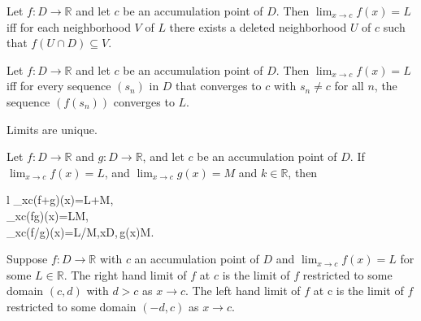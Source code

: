 \documentclass{article}
\begin{document}
\begin{theorem}
	Let \(f:D\rightarrow\mathbb{R}\) and let \(c\) be an accumulation point of \(D\). Then \(\lim_{x\rightarrow c}f(x)=L\) iff for each neighborhood \(V\) of \(L\) there exists a deleted neighborhood \(U\) of \(c\) such that \(f(U\cap D)\subseteq V\).
\end{theorem}
\begin{theorem}
	Let \(f:D\rightarrow\mathbb{R}\) and let \(c\) be an accumulation point of \(D\). Then \(\lim_{x\rightarrow c}f(x)=L\) iff for every sequence \((s_n)\) in \(D\) that converges to \(c\) with \(s_n\neq c\) for all \(n\), the sequence \((f(s_n))\) converges to \(L\).
\end{theorem}
\begin{corollary}
	Limits are unique.
\end{corollary}
\begin{theorem}
	Let \(f:D\rightarrow\mathbb{R}\) and \(g:D\rightarrow\mathbb{R}\), and let \(c\) be an accumulation point of \(D\). If \(\lim_{x\rightarrow c}f(x)=L\), and \(\lim_{x\rightarrow c}g(x)=M\) and \(k\in\mathbb{R}\), then
	\begin{IEEEeqnarray*}{l}
		\lim_{x\rightarrow c}(f+g)(x)=L+M,\\
		\lim_{x\rightarrow c}(fg)(x)=LM,\\
		\lim_{x\rightarrow c}(f/g)(x)=L/M,\forall x\in D,\,g(x)M.
	\end{IEEEeqnarray*}
\end{theorem}
\begin{definition}
	Suppose \(f:D\rightarrow\mathbb{R}\) with \(c\) an accumulation point of \(D\) and \(\lim_{x\rightarrow c}f(x)=L\) for some \(L\in\mathbb{R}\). The right hand limit of \(f\) at \(c\) is the limit of \(f\) restricted to some domain \((c,d)\) with \(d>c\) as \(x\rightarrow c\). The left hand limit of \(f\) at c is the limit of \(f\) restricted to some domain \((-d,c)\) as \(x\rightarrow c\).
\end{definition}
\end{document}
